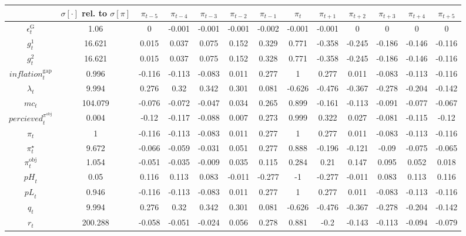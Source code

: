 \begin{tabular}{c|c|c|c|c|c|c|c|c|c|c|c|c|}
  & $\sigma[\cdot]$ rel. to $\sigma[\pi]$ & $\pi_{t-5}$ & $\pi_{t-4}$ & $\pi_{t-3}$ & $\pi_{t-2}$ & $\pi_{t-1}$ & $\pi_{t}$ & $\pi_{t+1}$ & $\pi_{t+2}$ & $\pi_{t+3}$ & $\pi_{t+4}$ & $\pi_{t+5}$\\
\hline
$\epsilon^{\mathrm{G}}_{t}$ & 1.06 & 0 & -0.001 & -0.001 & -0.001 & -0.002 & -0.001 & -0.001 & 0 & 0 & 0 & 0 \\
$g^{\mathrm{1}}_{t}$ & 16.621 & 0.015 & 0.037 & 0.075 & 0.152 & 0.329 & 0.771 & -0.358 & -0.245 & -0.186 & -0.146 & -0.116 \\
$g^{\mathrm{2}}_{t}$ & 16.621 & 0.015 & 0.037 & 0.075 & 0.152 & 0.328 & 0.771 & -0.358 & -0.245 & -0.186 & -0.146 & -0.116 \\
${i\!n\!f\!l\!a\!t\!i\!o\!n}^{\mathrm{gap}}_{t}$ & 0.996 & -0.116 & -0.113 & -0.083 & 0.011 & 0.277 & 1 & 0.277 & 0.011 & -0.083 & -0.113 & -0.116 \\
$\lambda_{t}$ & 9.994 & 0.276 & 0.32 & 0.342 & 0.301 & 0.081 & -0.626 & -0.476 & -0.367 & -0.278 & -0.204 & -0.142 \\
${m\!c}_{t}$ & 104.079 & -0.076 & -0.072 & -0.047 & 0.034 & 0.265 & 0.899 & -0.161 & -0.113 & -0.091 & -0.077 & -0.067 \\
${p\!e\!r\!c\!i\!e\!v\!e\!d}^{\pi^{\mathrm{obj}}}_{t}$ & 0.004 & -0.12 & -0.117 & -0.088 & 0.007 & 0.273 & 0.999 & 0.322 & 0.027 & -0.081 & -0.115 & -0.12 \\
$\pi_{t}$ & 1 & -0.116 & -0.113 & -0.083 & 0.011 & 0.277 & 1 & 0.277 & 0.011 & -0.083 & -0.113 & -0.116 \\
$\pi^{\star}_{t}$ & 9.672 & -0.066 & -0.059 & -0.031 & 0.051 & 0.277 & 0.888 & -0.196 & -0.121 & -0.09 & -0.075 & -0.065 \\
$\pi^{\mathrm{obj}}_{t}$ & 1.054 & -0.051 & -0.035 & -0.009 & 0.035 & 0.115 & 0.284 & 0.21 & 0.147 & 0.095 & 0.052 & 0.018 \\
${p\!H}_{t}$ & 0.05 & 0.116 & 0.113 & 0.083 & -0.011 & -0.277 & -1 & -0.277 & -0.011 & 0.083 & 0.113 & 0.116 \\
${p\!L}_{t}$ & 0.946 & -0.116 & -0.113 & -0.083 & 0.011 & 0.277 & 1 & 0.277 & 0.011 & -0.083 & -0.113 & -0.116 \\
$q_{t}$ & 9.994 & 0.276 & 0.32 & 0.342 & 0.301 & 0.081 & -0.626 & -0.476 & -0.367 & -0.278 & -0.204 & -0.142 \\
$r_{t}$ & 200.288 & -0.058 & -0.051 & -0.024 & 0.056 & 0.278 & 0.881 & -0.2 & -0.143 & -0.113 & -0.094 & -0.079 \\

\end{tabular}
